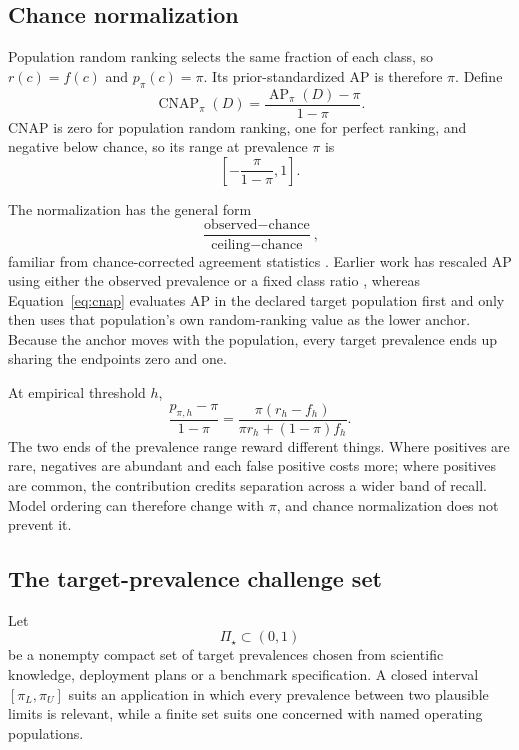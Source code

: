 \documentclass[11pt]{article}
\newcommand{\AP}{\operatorname{AP}}
\newcommand{\CNAP}{\operatorname{CNAP}}
\newcommand{\PSet}{\Pi_\star}
\theoremstyle{remark}
\begin{document}
\subsection{Chance normalization}

Population random ranking selects the same fraction of each class, so $r(c)=f(c)$ and $p_\pi(c)=\pi$. Its prior-standardized AP is therefore $\pi$. Define
\begin{equation}
\CNAP_\pi(D)
=
\frac{\AP_\pi(D)-\pi}{1-\pi}.
\label{eq:cnap}
\end{equation}
CNAP is zero for population random ranking, one for perfect ranking, and negative below chance, so its range at prevalence $\pi$ is
\[
\left[-\frac{\pi}{1-\pi},1\right].
\]

The normalization has the general form
\[
\frac{\text{observed}-\text{chance}}
{\text{ceiling}-\text{chance}},
\]
familiar from chance-corrected agreement statistics \cite{cohen1960coefficient}. Earlier work has rescaled AP using either the observed prevalence or a fixed class ratio \cite{suyuan2015relationship,bestgen2021fisher}, whereas Equation~\eqref{eq:cnap} evaluates AP in the declared target population first and only then uses that population's own random-ranking value as the lower anchor. Because the anchor moves with the population, every target prevalence ends up sharing the endpoints zero and one.

At empirical threshold $h$,
\begin{equation}
\frac{p_{\pi,h}-\pi}{1-\pi}
=
\frac{\pi(r_h-f_h)}
{\pi r_h+(1-\pi)f_h}.
\label{eq:threshold-cnap}
\end{equation}
The two ends of the prevalence range reward different things. Where positives are rare, negatives are abundant and each false positive costs more; where positives are common, the contribution credits separation across a wider band of recall. Model ordering can therefore change with $\pi$, and chance normalization does not prevent it.

\subsection{The target-prevalence challenge set}

Let
\[
\PSet\subset(0,1)
\]
be a nonempty compact set of target prevalences chosen from scientific knowledge, deployment plans or a benchmark specification. A closed interval $[\pi_L,\pi_U]$ suits an application in which every prevalence between two plausible limits is relevant, while a finite set suits one concerned with named operating populations.
\end{document}
